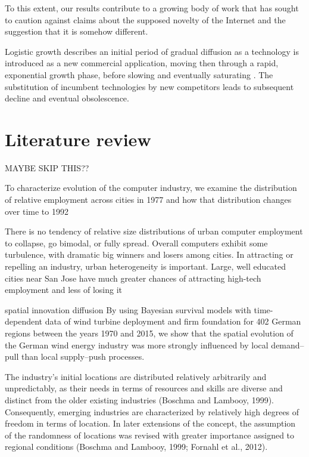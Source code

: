\documentclass[
  authoryear,
  preprint,
  3p]{elsarticle}
\begin{document}
To this extent, our results contribute to a growing body of work that
has sought to caution against claims about the supposed novelty of the
Internet and the suggestion that it is somehow different.

\citet{wilson201281} Logistic growth describes an initial period of
gradual diffusion as a technology is introduced as a new commercial
application, moving then through a rapid, exponential growth phase,
before slowing and eventually saturating \citep{grubler1999dynamics}.
The substitution of incumbent technologies by new competitors leads to
subsequent decline and eventual obsolescence.

\hypertarget{sec2}{%
\section{Literature review}\label{sec2}}

MAYBE SKIP THIS??

\citet{beardsell1999spatial} To characterize evolution of the computer
industry, we examine the distribution of relative employment across
cities in 1977 and how that distribution changes over time to 1992

There is no tendency of relative size distributions of urban computer
employment to collapse, go bimodal, or fully spread. Overall computers
exhibit some turbulence, with dramatic big winners and losers among
cities. In attracting or repelling an industry, urban heterogeneity is
important. Large, well educated cities near San Jose have much greater
chances of attracting high-tech employment and less of losing it

\citet{bednarz2020pulled} spatial innovation diffusion By using Bayesian
survival models with time-dependent data of wind turbine deployment and
firm foundation for 402 German regions between the years 1970 and 2015,
we show that the spatial evolution of the German wind energy industry
was more strongly influenced by local demand-- pull than local
supply--push processes.

The industry's initial locations are distributed relatively arbitrarily
and unpredictably, as their needs in terms of resources and skills are
diverse and distinct from the older existing industries (Boschma and
Lambooy, 1999). Consequently, emerging industries are characterized by
relatively high degrees of freedom in terms of location. In later
extensions of the concept, the assumption of the randomness of locations
was revised with greater importance assigned to regional conditions
(Boschma and Lambooy, 1999; Fornahl et al., 2012).
\end{document}

